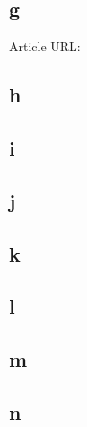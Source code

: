 \documentclass[12pt]{article} %
\begin{document}
	\subsection{g}
		Article URL:
		\newline
		
	\subsection{h}

	\subsection{i}
	
	\subsection{j}
	
	\subsection{k}
	
	\subsection{l}
	
	\subsection{m}
	
	\subsection{n}
\end{document}
